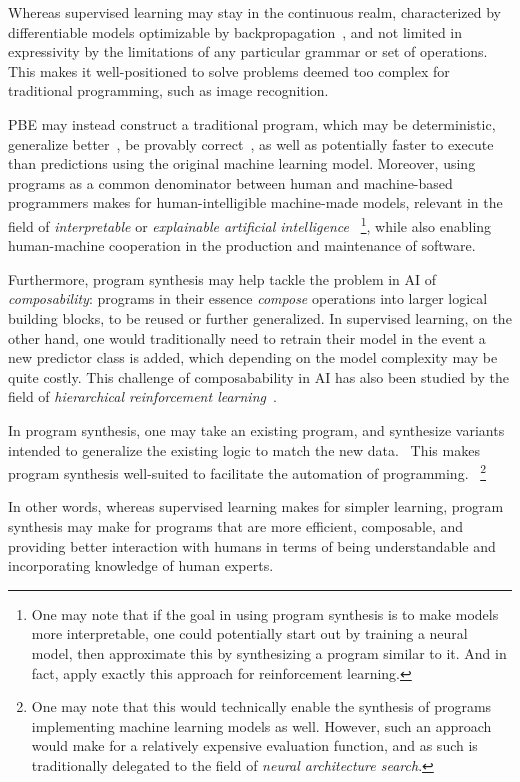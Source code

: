 \documentclass{article}
\begin{document}
Whereas supervised learning may stay in the continuous realm,
characterized by differentiable models optimizable by backpropagation~\citep{backproprnn},
and not limited in expressivity by the limitations of any particular grammar or set of operations.
This makes it well-positioned to solve problems deemed too complex for traditional programming, such as image recognition.

PBE may instead construct a traditional program,
which may be deterministic, generalize better~\citep{nps}, be provably correct~\citep{nps}, as well as potentially faster to execute than predictions using the original machine learning model.
Moreover, using programs as a common denominator between human and machine-based programmers makes for human-intelligible machine-made models,
relevant in the field of \emph{interpretable} or \emph{explainable artificial intelligence}
~\footnote{
    One may note that if the goal in using program synthesis is to make models more interpretable,
    one could potentially start out by training a neural model, then approximate this by synthesizing a program similar to it. And in fact, \citet{pirl} apply exactly this approach for reinforcement learning.
},
while also enabling human-machine cooperation in the production and maintenance of software.

Furthermore, program synthesis may help tackle the problem in AI of \emph{composability}:
programs in their essence \emph{compose} operations into larger logical building blocks,
to be reused or further generalized.
In supervised learning, on the other hand,
one would traditionally need to retrain their model in the event a new predictor class is added,
which depending on the model complexity may be quite costly.
This challenge of composabability in AI has also been studied by the field of \emph{hierarchical reinforcement learning}~\citep{hierarchicalrl}.

In program synthesis, one may take an existing program, and synthesize variants intended to generalize the existing logic to match the new data.~\citep{myth}
This makes program synthesis well-suited to facilitate the automation of programming.
~\footnote{
    One may note that this would technically enable the synthesis of programs implementing machine learning models as well.
    However, such an approach would make for a relatively expensive evaluation function,
    and as such is traditionally delegated to the field of \emph{neural architecture search}.
}

In other words, whereas supervised learning makes for simpler learning,
program synthesis may make for programs that are more efficient, composable,
and providing better interaction with humans in terms of being understandable and incorporating knowledge of human experts.
\end{document}
